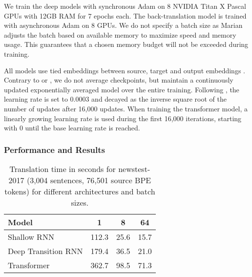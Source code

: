 \documentclass[11pt,a4paper]{article}
\begin{document}
  We train the deep models with synchronous Adam on 8 NVIDIA Titan X Pascal GPUs with 12GB RAM for 7 epochs each. The back-translation model is trained with asynchronous Adam on 8 GPUs. We do not specify a batch size as Marian adjusts the batch based on available memory to maximize speed and memory usage.  This guarantees that a chosen memory budget will not be exceeded during training.

  All models use tied embeddings between source, target and output embeddings \cite{press2017using}. Contrary to  or , we do not average checkpoints, but maintain a continuously updated exponentially averaged model over the entire training. Following , the learning rate is set to 0.0003 and decayed as the inverse square root of the number of updates after 16,000 updates. When training the transformer model, a linearly growing learning rate is used during the first 16,000 iterations, starting with 0 until the base learning rate is reached. 

  \subsubsection{Performance and Results}

  \begin{table}[t]
  \centering
  \begin{tabular}{lccc}\toprule
  Model & 1 & 8 & 64 \\ \midrule
  Shallow RNN & 112.3 & 25.6 & 15.7\\
  Deep Transition RNN & 179.4 & 36.5 & 21.0\\
  Transformer & 362.7 & 98.5 & 71.3\\ \bottomrule
  \end{tabular}
  \caption{Translation time in seconds for newstest-2017 (3,004 sentences, 76,501 source BPE tokens) for different architectures and batch sizes.}
  \label{tab-trans}
  \end{table}



\end{document}
